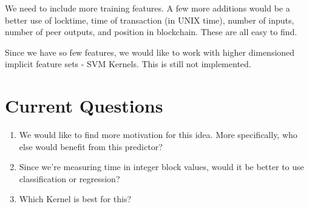 \documentclass[12pt]{article}
\begin{document}
We need to include more training features. A few more additions would be a better use of locktime, time of transaction (in UNIX time), number of inputs, number of peer outputs, and position in blockchain. These are all easy to find.

Since we have so few features, we would like to work with higher dimensioned implicit feature sets - \ie SVM Kernels. This is still not implemented.

\section*{Current Questions}
\begin{enumerate}
\item We would like to find more motivation for this idea. More specifically, who else would benefit from this predictor?
\item Since we're measuring time in integer block values, would it be better to use classification or regression?
\item Which Kernel is best for this?
\end{enumerate}



\newpage

\end{document}

